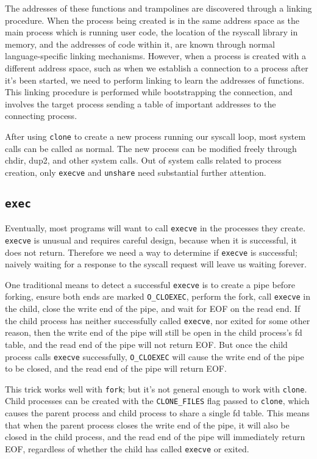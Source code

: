 \documentclass{acmart}
\begin{document}
The addresses of these functions and trampolines are discovered through a linking procedure.
When the process being created is in the same address space as the main process which is running user code,
the location of the rsyscall library in memory, and the addresses of code within it,
are known through normal language-specific linking mechanisms.
However, when a process is created with a different address space,
such as when we establish a connection to a process after it's been started,
we need to perform linking to learn the addresses of functions.
This linking procedure is performed while bootstrapping the connection,
and involves the target process sending a table of important addresses to the connecting process.

After using \texttt{clone} to create a new process running our syscall loop,
most system calls can be called as normal.
The new process can be modified freely through chdir, dup2, and other system calls.
Out of system calls related to process creation,
only \texttt{execve} and \texttt{unshare} need substantial further attention.
\subsection{\texttt{exec}}
Eventually, most programs will want to call \texttt{execve} in the processes they create.
\texttt{execve} is unusual and requires careful design,
because when it is successful, it does not return.
Therefore we need a way to determine if \texttt{execve} is successful;
naively waiting for a response to the syscall request will leave us waiting forever.

One traditional means to detect a successful \texttt{execve} is to create a pipe before forking,
ensure both ends are marked \verb|O_CLOEXEC|,
perform the fork,
call \texttt{execve} in the child,
close the write end of the pipe,
and wait for EOF on the read end.
If the child process has neither successfully called \texttt{execve}, nor exited for some other reason,
then the write end of the pipe will still be open in the child process's fd table,
and the read end of the pipe will not return EOF.
But once the child process calls \texttt{execve} successfully,
\verb|O_CLOEXEC| will cause the write end of the pipe to be closed,
and the read end of the pipe will return EOF.

This trick works well with \texttt{fork};
but it's not general enough to work with \texttt{clone}.
Child processes can be created with the \verb|CLONE_FILES| flag passed to \texttt{clone},
which causes the parent process and child process to share a single fd table.
This means that when the parent process closes the write end of the pipe,
it will also be closed in the child process,
and the read end of the pipe will immediately return EOF,
regardless of whether the child has called \texttt{execve} or exited.
\end{document}
